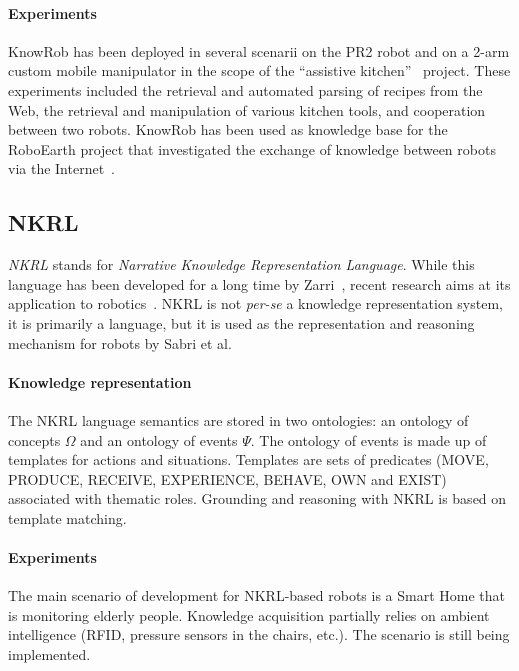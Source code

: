\documentclass[journal]{IEEEtran}
\begin{document}
\paragraph{Experiments} {\sc KnowRob} has been deployed in several scenarii 
on the PR2 robot and on a 2-arm custom mobile manipulator in the scope of the 
``assistive kitchen''~\cite{Beetz2008} project. These experiments included the
retrieval and automated parsing of recipes from the Web, the retrieval and 
manipulation of various kitchen tools, and cooperation between two robots.
{\sc KnowRob} has been used as knowledge base for the RoboEarth project that 
investigated the exchange of knowledge between robots via the 
Internet~\cite{waibel11roboearth}.


\subsection{NKRL}
\label{sect|nkrl}

\emph{NKRL} stands for \emph{Narrative Knowledge Representation Language}.
While this language has been developed for a long time by Zarri~\cite{Zarri1997,
Zarri2008}, recent research aims at its application to robotics~\cite{Sabri2011}. 
NKRL is not {\it per-se} a knowledge representation system, it is primarily 
a language, but it is used as the representation and reasoning mechanism for 
robots by Sabri et al.

\paragraph{Knowledge representation} The NKRL language semantics are stored in
two ontologies: an ontology of concepts $\Omega$ and an ontology of events
$\Psi$. The ontology of events is made up of templates for actions and situations.
Templates are sets of predicates (MOVE, PRODUCE, RECEIVE, EXPERIENCE, BEHAVE,
OWN and EXIST) associated with thematic roles. Grounding and reasoning with NKRL
is based on template matching.

\paragraph{Experiments} The main scenario of development for NKRL-based robots
is a Smart Home that is monitoring elderly people. Knowledge acquisition
partially relies on ambient intelligence (RFID, pressure sensors in the chairs,
etc.). The scenario is still being implemented.
\end{document}
